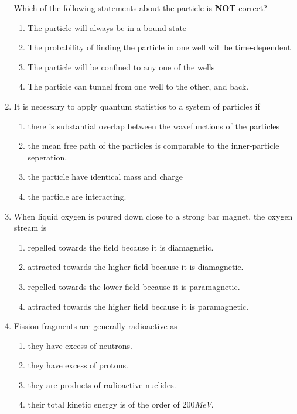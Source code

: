 \documentclass[journal]{IEEEtran}
\begin{document}
\begin{enumerate}
    Which of the following statements about the particle is \textbf{NOT} correct?
    \begin{enumerate}
            \item The particle will always be in a bound state  
            \item The probability of finding the particle in one well will be time-dependent
            \item The particle will be confined to any one of the wells 
            \item The particle can tunnel from one well to the other, and back.
    \end{enumerate}
    \item It is necessary to apply quantum statistics to a system of particles if 
    \begin{enumerate}
        \item there is substantial overlap between the wavefunctions of the particles
        \item the mean free path of the particles is comparable to the inner-particle seperation.
        \item the particle have identical mass and charge 
        \item the particle are interacting.
\end{enumerate}
\item When liquid oxygen is poured down close to a strong bar magnet, the oxygen stream is 
\begin{enumerate}
    \item repelled towards the field because it is diamagnetic.
    \item attracted towards the higher field because it is diamagnetic.
    \item repelled towards the lower field because it is paramagnetic.
    \item attracted towards the higher field because it is paramagnetic.
\end{enumerate}
\item Fission fragments are generally radioactive as 
\begin{enumerate}
    \item they have excess of neutrons. 
    \item they have excess of protons.
    \item they are products of radioactive nuclides.
    \item their total kinetic energy is of the order of $200MeV$.
\end{enumerate}

\end{enumerate}
\end{document}
